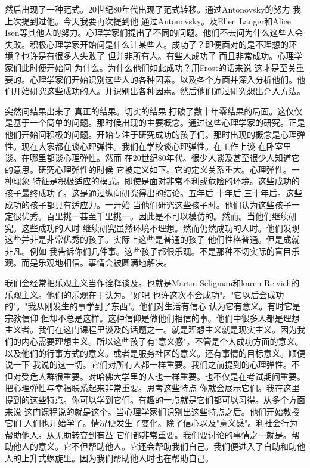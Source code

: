 然后出现了一种范式。20世纪80年代出现了范式转移。通过Antonovsky的努力 我上次提到过他。今天我要再次提到他 通过Antonovsky。及Ellen Langer和Alice Isen等其他人的努力。心理学家们提出了不同的问题。他们不去问为什么这些人会失败。积极心理学家开始问是什么让某些人。成功了？即便面对的是不理想的环境？也许是有很多人失败了 但并非所有人。有些人成功了 而且非常成功。心理学家们此时便开始问 为什么。为什么他们如此成功？用Frost的话来说 这才是至关重要的。心理学家们开始识别这些人的各种因素。以及各个方面并深入分析他们。他们开始研究这些成功的人。并识别出各种因素。然后他们通过研究想出介入方法。 

突然间结果出来了 真正的结果。切实的结果 打破了数十年零结果的局面。这仅仅是基于一个简单的问题。那时候出现的主要概念。通过这些心理学家的研究。正是他们开始问积极的问题。开始专注于研究成功的孩子们。那时出现的概念是心理弹性。现在大家都在谈心理弹性。我们在学校谈心理弹性。在工作上谈 在卧室里谈。在哪里都谈心理弹性。然而 在20世纪80年代。很少人谈及甚至很少人知道它的意思。研究心理弹性的时候 它被定义如下。它的定义关系重大。心理弹性。一种现象 特征是积极适应的模式。即使是面对非常不利或危险的环境。这些成功的孩子最终成功了。这是通过纵向研究得出的结论。五年后 十年后 三十年后。这些成功的孩子都具有适应力。一开始 当他们研究这些孩子时。他们认为这些孩子一定很优秀。百里挑一甚至千里挑一。因此是不可以模仿的。然而。当他们继续研究。这些成功的人时 继续研究虽然环境不理想。然而仍然成功的人时。他们发现这些并非是非常优秀的孩子。实际上这些是普通的孩子 他们性格普通。但是成就非凡。例如 我告诉你们几件事。这些孩子都很乐观。不是那种不切实际的盲目乐观。而是乐观地相信。事情会被圆满地解决。 

我们会经常把乐观主义当作诠释谈及。也就是Martin Seligman和karen Reivich的乐观主义。他们的乐观在于认为。"好吧 也许这次不会成功"。"它以后会成功的"。"我从刚发生的事学到了东西"。他们对生活有信心 认为它有意义。有时它是宗教信仰 但却不总是这样。这种信仰是做他们相信的事。他们中很多人都是理想主义者。我们在这门课程里谈及的话题之一。就是理想主义就是现实主义。因为我们的内心需要理想主义。所以这些孩子有"意义感"。不管是个人成功方面的意义。以及他们的行事方式的意义。或者是服务社区的意义。还有事情的目标意义。顺便说一下 我说的这一切。它们对所有人都一样重要。我们之前提到的心理弹性。不但对受危人群很重要。对哈佛大学里的人也一样重要。也不仅是在考试期间重要。把心理弹性与幸福联系起来非常重要。思考这些特点 你就会展示它们。我在这里提到的这些特点。你可以学到它们。有趣的一点就是它们都可以习得。从多个方面来说 这门课程说的就是这个。当心理学家们识别出这些特点之后。他们开始教授它们 人们也开始学了。情况便发生了变化。除了信心以及"意义感"。利社会行为 帮助他人。从无助转变到有益 它们都非常重要。我们要讨论的事情之一就是。帮助他人的意义。它不但帮助他人。它还会帮助我们自己。我们便进入了自助和助他人的上升式螺旋里。因为我们帮助他人时也在帮助自己。 

